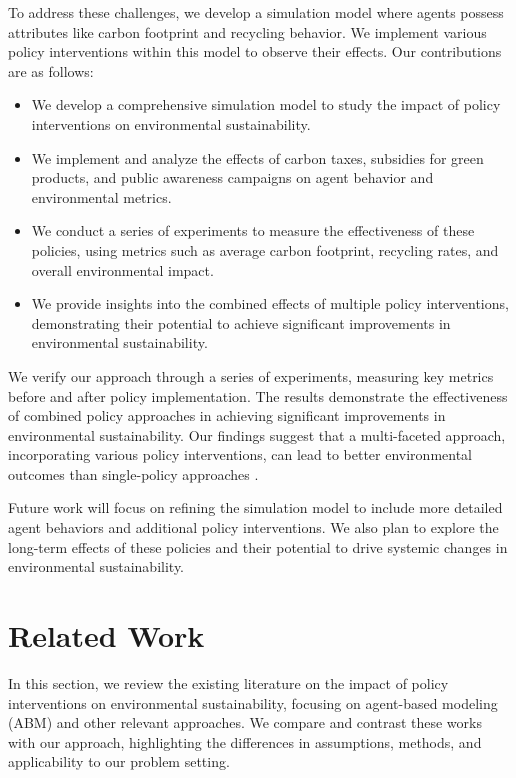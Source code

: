 \documentclass{article} %
\begin{document}
To address these challenges, we develop a simulation model where agents possess attributes like carbon footprint and recycling behavior. We implement various policy interventions within this model to observe their effects. Our contributions are as follows:
\begin{itemize}
    \item We develop a comprehensive simulation model to study the impact of policy interventions on environmental sustainability.
    \item We implement and analyze the effects of carbon taxes, subsidies for green products, and public awareness campaigns on agent behavior and environmental metrics.
    \item We conduct a series of experiments to measure the effectiveness of these policies, using metrics such as average carbon footprint, recycling rates, and overall environmental impact.
    \item We provide insights into the combined effects of multiple policy interventions, demonstrating their potential to achieve significant improvements in environmental sustainability.
\end{itemize}

We verify our approach through a series of experiments, measuring key metrics before and after policy implementation. The results demonstrate the effectiveness of combined policy approaches in achieving significant improvements in environmental sustainability. Our findings suggest that a multi-faceted approach, incorporating various policy interventions, can lead to better environmental outcomes than single-policy approaches \citep{liu2023agentbench}.

Future work will focus on refining the simulation model to include more detailed agent behaviors and additional policy interventions. We also plan to explore the long-term effects of these policies and their potential to drive systemic changes in environmental sustainability.

\section{Related Work}
\label{sec:related}

In this section, we review the existing literature on the impact of policy interventions on environmental sustainability, focusing on agent-based modeling (ABM) and other relevant approaches. We compare and contrast these works with our approach, highlighting the differences in assumptions, methods, and applicability to our problem setting.
\end{document}
